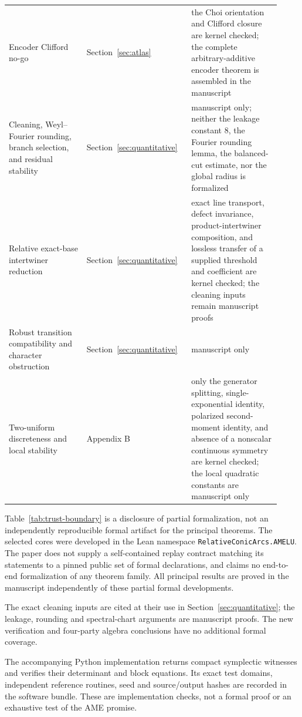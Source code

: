 \begin{table}[H]
\begin{tabular}{@{}L{0.27\linewidth}L{0.34\linewidth}L{0.31\linewidth}@{}}
Encoder Clifford no-go & Section~\ref{sec:atlas} &
the Choi orientation and Clifford closure are kernel checked; the complete
arbitrary-additive encoder theorem is assembled in the manuscript \\
Cleaning, Weyl--Fourier rounding, branch selection, and residual stability &
Section~\ref{sec:quantitative} &
manuscript only; neither the leakage constant \(8\), the Fourier rounding
lemma, the balanced-cut estimate, nor the global radius is formalized \\
Relative exact-base intertwiner reduction &
Section~\ref{sec:quantitative} &
exact line transport, defect invariance, product-intertwiner composition, and
lossless transfer of a supplied threshold and coefficient are kernel checked;
the cleaning inputs remain manuscript proofs \\
Robust transition compatibility and character obstruction &
Section~\ref{sec:quantitative} & manuscript only \\
Two-uniform discreteness and local stability & Appendix B &
only the generator splitting, single-exponential identity, polarized
second-moment identity, and absence of a nonscalar continuous symmetry are
kernel checked; the local quadratic constants are manuscript only \\
\bottomrule
\end{tabular}
\end{table}

Table~\ref{tab:trust-boundary} is a disclosure of partial formalization,
not an independently reproducible formal artifact for the principal theorems.
The selected cores were developed in the Lean namespace
\texttt{RelativeConicArcs.AMELU}.  The paper does not supply a self-contained
replay contract matching its statements to a pinned public set of formal
declarations, and claims no end-to-end formalization of any theorem family.
All principal results are proved in the manuscript independently of these
partial formal developments.

The exact cleaning inputs are cited at their use in
Section~\ref{sec:quantitative}; the leakage, rounding and spectral-chart
arguments are manuscript proofs.  The new verification and four-party
algebra conclusions have no additional formal coverage.

The accompanying Python implementation returns compact symplectic witnesses
and verifies their determinant and block equations.  Its exact test domains,
independent reference routines, seed and source/output hashes are recorded
in the software bundle.  These are implementation checks, not a formal proof
or an exhaustive test of the AME promise.
